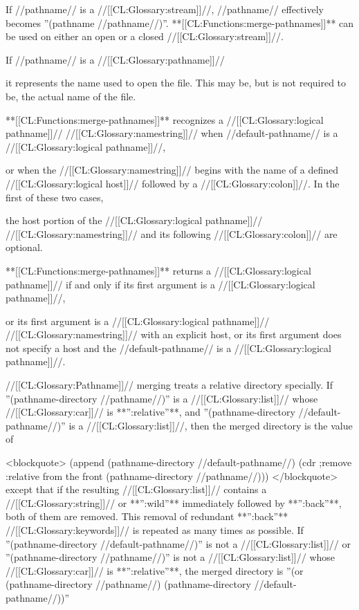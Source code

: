If //pathname// is a //[[CL:Glossary:stream]]//, //pathname// effectively becomes ''(pathname //pathname//)''. **[[CL:Functions:merge-pathnames]]** can be used on either an open or a closed //[[CL:Glossary:stream]]//.

If //pathname// is a //[[CL:Glossary:pathname]]//

it represents the name used to open the file. This may be, but is not required to be, the actual name of the file.

**[[CL:Functions:merge-pathnames]]** recognizes a //[[CL:Glossary:logical pathname]]// //[[CL:Glossary:namestring]]// when //default-pathname// is a //[[CL:Glossary:logical pathname]]//,

or when the //[[CL:Glossary:namestring]]// begins with the name of a defined //[[CL:Glossary:logical host]]// followed by a //[[CL:Glossary:colon]]//. In the first of these two cases,

the host portion of the //[[CL:Glossary:logical pathname]]// //[[CL:Glossary:namestring]]// and its following //[[CL:Glossary:colon]]// are optional.

**[[CL:Functions:merge-pathnames]]** returns a //[[CL:Glossary:logical pathname]]// if and only if its first argument is a //[[CL:Glossary:logical pathname]]//,

or its first argument is a //[[CL:Glossary:logical pathname]]// //[[CL:Glossary:namestring]]// with an explicit host, or its first argument does not specify a host and the //default-pathname// is a //[[CL:Glossary:logical pathname]]//.



//[[CL:Glossary:Pathname]]// merging treats a relative directory specially. If ''(pathname-directory //pathname//)'' is a //[[CL:Glossary:list]]// whose //[[CL:Glossary:car]]// is **'':relative''**, and ''(pathname-directory //default-pathname//)'' is a //[[CL:Glossary:list]]//, then the merged directory is the value of

<blockquote> (append (pathname-directory //default-pathname//) (cdr ;remove :relative from the front (pathname-directory //pathname//))) </blockquote> except that if the resulting //[[CL:Glossary:list]]// contains a //[[CL:Glossary:string]]// or **'':wild''** immediately followed by **'':back''**, both of them are removed. This removal of redundant **'':back''** //[[CL:Glossary:keywords]]// is repeated as many times as possible. If ''(pathname-directory //default-pathname//)'' is not a //[[CL:Glossary:list]]// or ''(pathname-directory //pathname//)'' is not a //[[CL:Glossary:list]]// whose //[[CL:Glossary:car]]// is **'':relative''**, the merged directory is ''(or (pathname-directory //pathname//) (pathname-directory //default-pathname//))''

